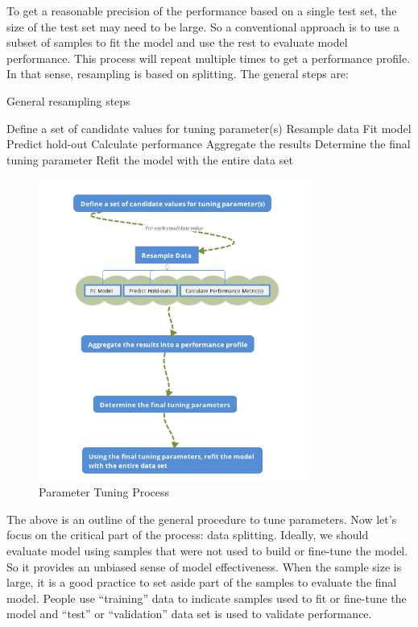 \documentclass[12pt,]{krantz}
\begin{document}
To get a reasonable precision of the performance based on a single test set, the size of the test set may need to be large. So a conventional approach is to use a subset of samples to fit the model and use the rest to evaluate model performance. This process will repeat multiple times to get a performance profile. In that sense, resampling is based on splitting. The general steps are:

\begin{algorithm}
\caption{General resampling steps}\label{resampling} 
\begin{algorithmic}[1] 
\State Define a set of candidate values for tuning parameter(s)
        \State Resample data
        \State Fit model
        \State Predict hold-out
        \State Calculate performance
    \EndFor
\State Aggregate the results
\State Determine the final tuning parameter
\State Refit the model with the entire data set
\end{algorithmic}
\end{algorithm}

\begin{figure}
\centering
\includegraphics[width=0.8\textwidth,height=\textheight]{images/ParameterTuningProcess.png}
\caption{Parameter Tuning Process}
\end{figure}

The above is an outline of the general procedure to tune parameters. Now let's focus on the critical part of the process: data splitting. Ideally, we should evaluate model using samples that were not used to build or fine-tune the model. So it provides an unbiased sense of model effectiveness. When the sample size is large, it is a good practice to set aside part of the samples to evaluate the final model. People use ``training'' data to indicate samples used to fit or fine-tune the model and ``test'' or ``validation'' data set is used to validate performance.
\end{document}
